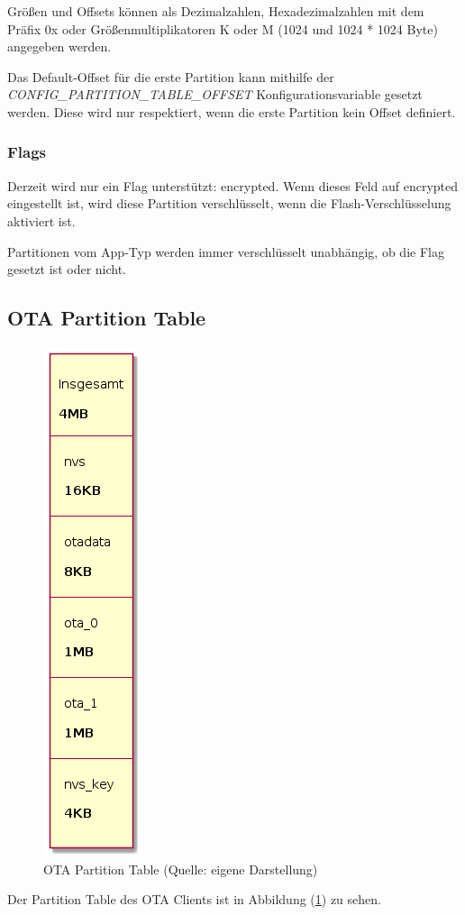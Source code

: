 Größen und Offsets können als Dezimalzahlen, Hexadezimalzahlen mit dem Präfix 0x oder Größenmultiplikatoren K oder M (1024 und 1024 * 1024 Byte) angegeben werden.

Das Default-Offset für die erste Partition kann mithilfe der \textit{CONFIG\_PARTITION\_TABLE\_OFFSET} Konfigurationsvariable gesetzt werden. Diese wird nur respektiert, wenn die erste Partition kein Offset definiert.

\subsubsection{Flags}
Derzeit wird nur ein Flag unterstützt: encrypted. Wenn dieses Feld auf encrypted eingestellt ist, wird diese Partition verschlüsselt, wenn die Flash-Verschlüsselung aktiviert ist.

Partitionen vom App-Typ werden immer verschlüsselt unabhängig, ob die Flag gesetzt ist oder nicht.\cite{espressif_partition_tables}

\subsection{OTA Partition Table}
\begin{figure}[H]
    \begin{center}
        \includegraphics[scale=0.7]{diagrams/ota_partition_table.png}
        \caption{OTA Partition Table (Quelle: eigene Darstellung)}
        \label{abb:ota_partition_table}
    \end{center}    
\end{figure}
Der Partition Table des OTA Clients ist in Abbildung (\ref{abb:ota_partition_table}) zu sehen.

